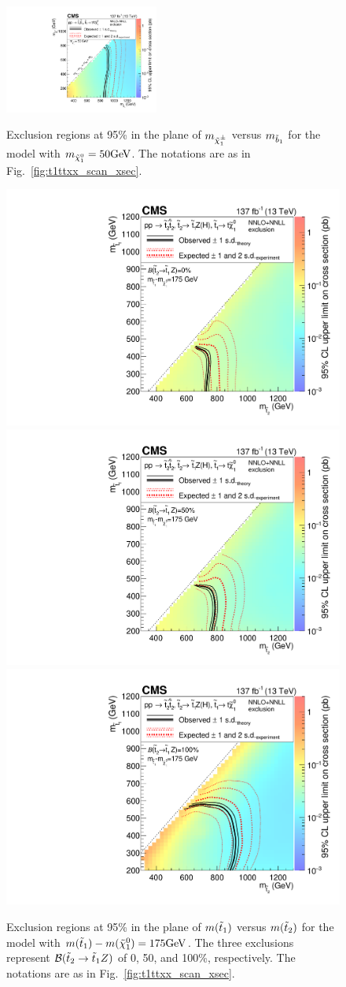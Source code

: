 \begin{figure}[!hbtp]
\centering
\includegraphics[width=0.45\textwidth]{figs/ssp/scan_t6ttww.pdf}\\
\caption{ Exclusion regions at 95\% \CL in the plane of $m_{\tilde{\chi}_1^{\pm}}$ versus $m_{\tilde{b}_1}$ for the \TsttWW model with $m_{\tilde{\chi}_1^0}=50\text{GeV}$.
    The notations are as in Fig.~\ref{fig:t1ttxx_scan_xsec}. }
\label{fig:t6ttww_scan_xsec}
\end{figure}

\begin{figure}[!hbtp]
\centering
\includegraphics[width=.45\textwidth]{figs/ssp/scan_t6tthzbrh.pdf}
\includegraphics[width=.45\textwidth]{figs/ssp/scan_t6tthzbrb.pdf} \\
\includegraphics[width=.45\textwidth]{figs/ssp/scan_t6tthzbrz.pdf}
\\
\caption{
Exclusion regions at 95\% \CL in the plane of $m(\tilde{t}_1)$ versus
$m(\tilde{t}_2)$ for the \TsttHZ model with $m(\tilde{t}_1)-m(\tilde{\chi}_1^0)=175\text{GeV}$.
The three exclusions represent $\mathcal{B}(\tilde{t}_2\to\tilde{t}_1Z)$ of
0, 50, and 100\%, respectively.
The notations are as in Fig.~\ref{fig:t1ttxx_scan_xsec}.
}
\label{fig:t6tthz_scan_xsec}
\end{figure}


